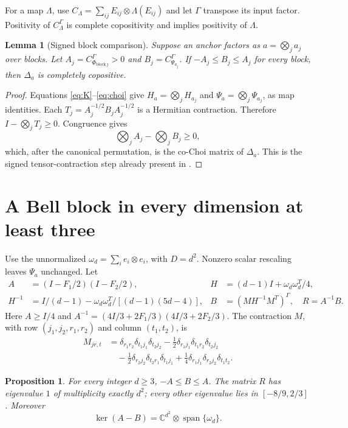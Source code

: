 \documentclass[11pt,a4paper]{article}
\newtheorem{lemma}[theorem]{Lemma}
\newtheorem{proposition}[theorem]{Proposition}
\begin{document}
For a map $\Lambda$, use $C_\Lambda=\sum_{ij}E_{ij}\otimes\Lambda(E_{ij})$ and let $\Gamma$ transpose its input factor. Positivity of $C_\Lambda^\Gamma$ is complete copositivity and implies positivity of $\Lambda$.
\begin{lemma}[Signed block comparison]\label{lem:tensor}
Suppose an anchor factors as $a=\bigotimes_j a_j$ over blocks. Let
$A_j=C_{\Phi_{\mathrm{block}\,j}}^\Gamma>0$ and
$B_j=C_{\Psi_{a_j}}^\Gamma$. If $-A_j\le B_j\le A_j$ for every block, then $\Delta_a$ is completely copositive.
\end{lemma}
\begin{proof}
Equations \eqref{eq:K}--\eqref{eq:choi} give $H_a=\bigotimes_jH_{a_j}$ and $\Psi_a=\bigotimes_j\Psi_{a_j}$, as map identities. Each
$T_j=A_j^{-1/2}B_jA_j^{-1/2}$ is a Hermitian contraction. Therefore $I-\bigotimes_j T_j\ge0$. Congruence gives
\[
 \bigotimes_j A_j-\bigotimes_j B_j\ge0,
\]
which, after the canonical permutation, is the co-Choi matrix of $\Delta_a$. This is the signed tensor-contraction step already present in \cite{wuzou}.
\end{proof}


\section{A Bell block in every dimension at least three}
Use the unnormalized $\omega_d=\sum_i e_i\otimes e_i$, with $D=d^2$.
Nonzero scalar rescaling leaves $\Psi_a$ unchanged. Let
\begin{align}\label{eq:bellblock}
 A&=(I-F_1/2)(I-F_2/2),&
 H&=(d-1)I+\omega_d\omega_d^T/4,\\
 H^{-1}&=I/(d-1)-\omega_d\omega_d^T/[(d-1)(5d-4)],&
 B&=(MH^{-1}M^T)^\Gamma,\quad R=A^{-1}B.\nonumber
\end{align}
Here $A\ge I/4$ and $A^{-1}=(4I/3+2F_1/3)(4I/3+2F_2/3)$.
The contraction $M$, with row $(j_1,j_2,r_1,r_2)$ and column $(t_1,t_2)$, is
\begin{align}\label{eq:bellM}
 M_{jr,t}&=\delta_{r_1r_2}\delta_{t_1j_1}\delta_{t_2j_2}
 -\tfrac12\delta_{r_1j_1}\delta_{t_1r_2}\delta_{t_2j_2}\\
 &\quad-\tfrac12\delta_{r_2j_2}\delta_{t_2r_1}\delta_{t_1j_1}
 +\tfrac14\delta_{r_1j_1}\delta_{r_2j_2}\delta_{t_1t_2}.\nonumber
\end{align}
\begin{proposition}\label{prop:bell}
For every integer $d\ge3$, $-A\le B\le A$. The matrix $R$ has eigenvalue $1$ of multiplicity exactly $d^2$; every other eigenvalue lies in $[-8/9,2/3]$. Moreover
\[
 \ker(A-B)=\mathbb C^{d^2}\otimes\operatorname{span}\{\omega_d\}.
\]
\end{proposition}
\end{document}
